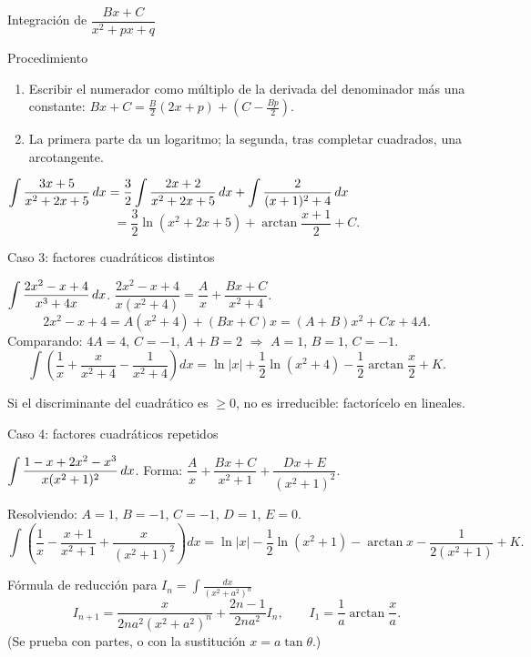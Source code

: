 \documentclass[10pt,aspectratio=169]{beamer}
\begin{document}
\begin{frame}{Integración de $\dfrac{Bx+C}{x^2+px+q}$}
  \begin{block}{Procedimiento}
    \begin{enumerate}
      \item Escribir el numerador como múltiplo de la derivada del denominador más una constante:
        $Bx+C=\frac B2(2x+p)+\left(C-\frac{Bp}2\right)$.
      \item La primera parte da un logaritmo; la segunda, tras completar cuadrados, una arcotangente.
    \end{enumerate}
  \end{block}
  \begin{ejemplo}[6]
    $\displaystyle\int\frac{3x+5}{x^2+2x+5}\,dx=\frac32\int\frac{2x+2}{x^2+2x+5}\,dx+\int\frac{2}{(x+1)^2+4}\,dx$
    \[ =\frac32\ln(x^2+2x+5)+\arctan\frac{x+1}{2}+C. \]
  \end{ejemplo}
\end{frame}

\begin{frame}{Caso 3: factores cuadráticos distintos}
  \begin{ejemplo}[7]
    $\displaystyle\int\frac{2x^2-x+4}{x^3+4x}\,dx$. \quad $\dfrac{2x^2-x+4}{x(x^2+4)}=\dfrac Ax+\dfrac{Bx+C}{x^2+4}$.
    \[ 2x^2-x+4=A(x^2+4)+(Bx+C)x=(A+B)x^2+Cx+4A. \]
    Comparando: $4A=4$, $C=-1$, $A+B=2$ $\Rightarrow$ $A=1$, $B=1$, $C=-1$.
    \[ \int\left(\frac1x+\frac{x}{x^2+4}-\frac{1}{x^2+4}\right)dx=\ln|x|+\frac12\ln(x^2+4)-\frac12\arctan\frac x2+K. \]
  \end{ejemplo}
  \begin{observacion}
    Si el discriminante del cuadrático es $\ge0$, \alert{no} es irreducible: factorícelo en lineales.
  \end{observacion}
\end{frame}

\begin{frame}{Caso 4: factores cuadráticos repetidos}
  \begin{ejemplo}[8]
    $\displaystyle\int\frac{1-x+2x^2-x^3}{x(x^2+1)^2}\,dx$. \quad Forma: $\dfrac Ax+\dfrac{Bx+C}{x^2+1}+\dfrac{Dx+E}{(x^2+1)^2}$.

    Resolviendo: $A=1$, $B=-1$, $C=-1$, $D=1$, $E=0$.
    \[ \int\left(\frac1x-\frac{x+1}{x^2+1}+\frac{x}{(x^2+1)^2}\right)dx
       =\ln|x|-\frac12\ln(x^2+1)-\arctan x-\frac{1}{2(x^2+1)}+K. \]
  \end{ejemplo}
  \begin{block}{Fórmula de reducción para $I_n=\int\frac{dx}{(x^2+a^2)^n}$}
    \[ I_{n+1}=\frac{x}{2na^2(x^2+a^2)^n}+\frac{2n-1}{2na^2}I_n,\qquad I_1=\frac1a\arctan\frac xa. \]
    (Se prueba con partes, o con la sustitución $x=a\tan\theta$.)
  \end{block}
\end{frame}
\end{document}
